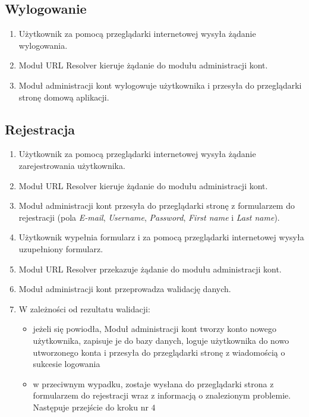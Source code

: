 \documentclass[pdflatex,11pt]{../aghdoc_version2}
\begin{document}
\subsection{Wylogowanie}
\begin{enumerate}
\item Użytkownik za pomocą przeglądarki internetowej wysyła żądanie wylogowania.
\item Moduł URL Resolver kieruje żądanie do modułu administracji kont.
\item Moduł administracji kont wylogowuje użytkownika i przesyła do przeglądarki stronę
domową aplikacji.
\end{enumerate}

\subsection{Rejestracja}
\begin{enumerate}
\item Użytkownik za pomocą przeglądarki internetowej wysyła żądanie zarejestrowania
użytkownika.
\item Moduł URL Resolver kieruje żądanie do modułu administracji kont.
\item Moduł administracji kont przesyła do przeglądarki stronę z formularzem do rejestracji
(pola \textit{E-mail}, \textit{Username}, \textit{Password}, \textit{First name} i \textit{Last name}).
\item Użytkownik wypełnia formularz i za pomocą przeglądarki internetowej wysyła
uzupełniony formularz.
\item Moduł URL Resolver przekazuje żądanie do modułu administracji kont.
\item Moduł administracji kont przeprowadza walidację danych.
\clearpage
\item W zależności od rezultatu walidacji:
	\begin{itemize}
	\item jeżeli się powiodła, Moduł administracji kont tworzy konto nowego użytkownika, 			zapisuje je do
	bazy danych, loguje użytkownika do nowo utworzonego konta i przesyła do
	przeglądarki stronę z wiadomością o sukcesie logowania
	\item w przeciwnym wypadku, zostaje wysłana do przeglądarki strona z
	formularzem do rejestracji wraz z informacją o znalezionym problemie.
	Następuje przejście do kroku nr $4$
	\end{itemize}
\end{enumerate}
\end{document}
